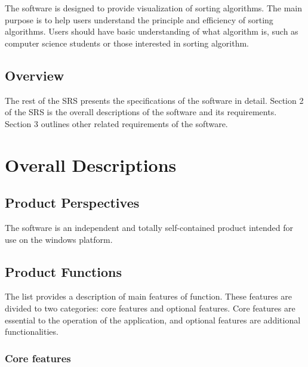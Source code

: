 \documentclass[12pt]{article}
\begin{document}
The software is designed to provide visualization of sorting algorithms. The main purpose is to help users understand the principle and efficiency of sorting algorithms. Users should have basic understanding of what algorithm is, such as computer science students or those interested in sorting algorithm.

\subsection{Overview}

The rest of the SRS presents the specifications of the software in detail. Section 2 of the SRS is the overall descriptions of the software and its requirements. Section 3 outlines other related requirements of the software.  

\section{Overall Descriptions}

\subsection{Product Perspectives}

The software is an independent and totally self-contained product intended for use on the windows platform.

\subsection{Product Functions}

The list provides a description of main features of function. These features are divided to two categories: core features and optional features. Core features are essential to the operation of the application, and optional features are additional functionalities.

\subsubsection{Core features}
\end{document}
